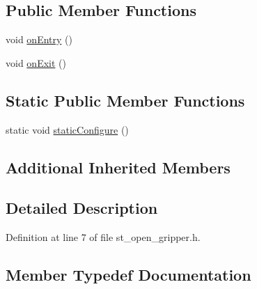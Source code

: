 \subsection*{Public Member Functions}
\begin{DoxyCompactItemize}
\item 
void \hyperlink{structsm__moveit__screw__loop_1_1place__states_1_1StOpenGripper_a7633b91c1212681930d6217847d01d0f}{on\+Entry} ()
\item 
void \hyperlink{structsm__moveit__screw__loop_1_1place__states_1_1StOpenGripper_afe0d259da8bfebae237269ed726c2097}{on\+Exit} ()
\end{DoxyCompactItemize}
\subsection*{Static Public Member Functions}
\begin{DoxyCompactItemize}
\item 
static void \hyperlink{structsm__moveit__screw__loop_1_1place__states_1_1StOpenGripper_a60c8d27bed7e4999878f0f4cf0f7f3c9}{static\+Configure} ()
\end{DoxyCompactItemize}
\subsection*{Additional Inherited Members}


\subsection{Detailed Description}


Definition at line 7 of file st\+\_\+open\+\_\+gripper.\+h.



\subsection{Member Typedef Documentation}
\mbox{\label{structsm__moveit__screw__loop_1_1place__states_1_1StOpenGripper_ad5cf03bea58766aa719db84ac1c98bf1}} 
